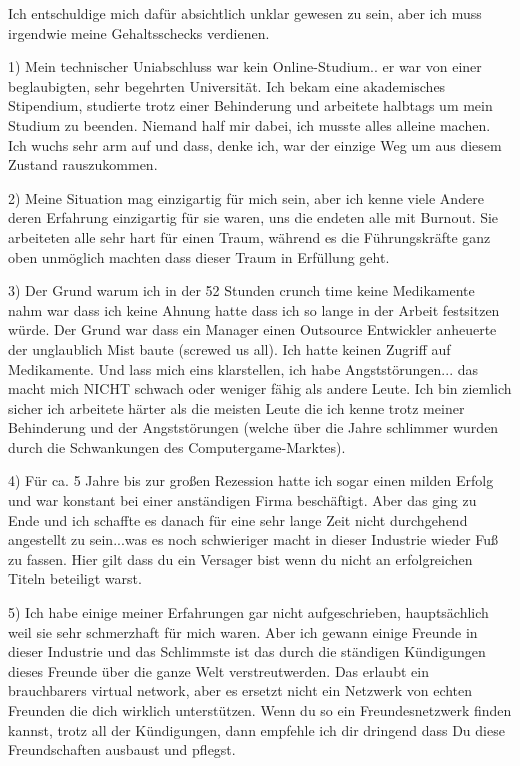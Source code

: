 Ich entschuldige mich dafür absichtlich unklar gewesen zu sein, aber ich muss irgendwie meine Gehaltsschecks verdienen. 

1) Mein technischer Uniabschluss war kein Online-Studium.. er war von einer beglaubigten, sehr begehrten Universität. Ich bekam eine akademisches Stipendium, studierte trotz einer Behinderung und arbeitete halbtags um mein Studium zu beenden. Niemand half mir dabei, ich musste alles alleine machen. Ich wuchs sehr arm auf und dass, denke ich, war der einzige Weg um aus diesem Zustand rauszukommen.

2) Meine Situation mag einzigartig für mich sein, aber ich kenne viele Andere deren Erfahrung einzigartig für sie waren, uns die endeten alle mit Burnout. Sie arbeiteten alle sehr hart für einen Traum, während es die Führungskräfte ganz oben unmöglich machten dass dieser Traum in Erfüllung geht.

3) Der Grund warum ich in der 52 Stunden crunch time keine Medikamente nahm war dass ich keine Ahnung hatte dass ich so lange in der Arbeit festsitzen würde. Der Grund war dass ein Manager einen Outsource Entwickler anheuerte der unglaublich Mist baute (screwed us all). Ich hatte keinen Zugriff auf Medikamente. Und lass mich eins klarstellen, ich habe Angststörungen... das macht mich NICHT schwach oder weniger fähig als andere Leute. Ich bin ziemlich sicher ich arbeitete härter als die meisten Leute die ich kenne trotz meiner Behinderung und der Angststörungen (welche über die Jahre schlimmer wurden durch die Schwankungen des Computergame-Marktes).

4) Für ca. 5 Jahre bis zur großen Rezession hatte ich sogar einen milden Erfolg und war konstant bei einer anständigen Firma beschäftigt. Aber das ging zu Ende und ich schaffte es danach für eine sehr lange Zeit nicht durchgehend angestellt zu sein...was es noch schwieriger macht in dieser Industrie wieder Fuß zu fassen. Hier gilt dass du ein Versager bist wenn du nicht an erfolgreichen Titeln beteiligt warst.

5) Ich habe einige meiner Erfahrungen gar nicht aufgeschrieben, hauptsächlich weil sie sehr schmerzhaft für mich waren. Aber ich gewann einige Freunde in dieser Industrie und das Schlimmste ist das durch die ständigen Kündigungen dieses Freunde über die ganze Welt verstreutwerden. Das erlaubt ein brauchbarers virtual network, aber es ersetzt nicht ein Netzwerk von echten Freunden die dich wirklich unterstützen. Wenn du so ein Freundesnetzwerk finden kannst, trotz all der Kündigungen, dann empfehle ich dir dringend dass Du diese Freundschaften ausbaust und pflegst. 

